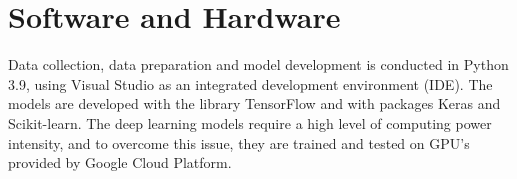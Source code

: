 \indent\newline 
\begin{table}[ht]
\centering
{}
\caption{Large cap summary statistics}
\end{table} 

\section{Software and Hardware}  
Data collection, data preparation and model development is conducted in Python 3.9, using Visual Studio as an integrated development environment (IDE). The models are developed with the library TensorFlow and with packages Keras and Scikit-learn. The deep learning models require a high level of computing power intensity, and to overcome this issue, they are trained and tested on GPU's provided by Google Cloud Platform.  